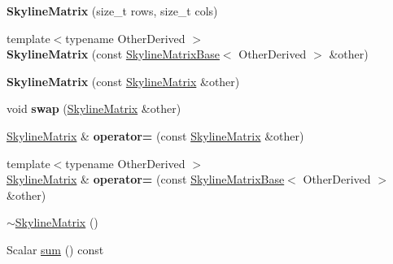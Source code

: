 \begin{DoxyCompactItemize}
{\bfseries Skyline\+Matrix} (size\+\_\+t rows, size\+\_\+t cols)
\item 
\mbox{\label{class_eigen_1_1_skyline_matrix_a8dbe4249614b89be421470e78592ce5b}} 
{\footnotesize template$<$typename Other\+Derived $>$ }\\{\bfseries Skyline\+Matrix} (const \hyperlink{class_eigen_1_1_skyline_matrix_base}{Skyline\+Matrix\+Base}$<$ Other\+Derived $>$ \&other)
\item 
\mbox{\label{class_eigen_1_1_skyline_matrix_af121abd994f8cb8a8b2c71eeaa843237}} 
{\bfseries Skyline\+Matrix} (const \hyperlink{class_eigen_1_1_skyline_matrix}{Skyline\+Matrix} \&other)
\item 
\mbox{\label{class_eigen_1_1_skyline_matrix_ab7c63da758aec8c76c3702c09b5f76a9}} 
void {\bfseries swap} (\hyperlink{class_eigen_1_1_skyline_matrix}{Skyline\+Matrix} \&other)
\item 
\mbox{\label{class_eigen_1_1_skyline_matrix_a00f9f9d0c8006efcc90074d8d6b046a2}} 
\hyperlink{class_eigen_1_1_skyline_matrix}{Skyline\+Matrix} \& {\bfseries operator=} (const \hyperlink{class_eigen_1_1_skyline_matrix}{Skyline\+Matrix} \&other)
\item 
\mbox{\label{class_eigen_1_1_skyline_matrix_a1f0aa06c7086d658416dc57076642525}} 
{\footnotesize template$<$typename Other\+Derived $>$ }\\\hyperlink{class_eigen_1_1_skyline_matrix}{Skyline\+Matrix} \& {\bfseries operator=} (const \hyperlink{class_eigen_1_1_skyline_matrix_base}{Skyline\+Matrix\+Base}$<$ Other\+Derived $>$ \&other)
\item 
\hyperlink{class_eigen_1_1_skyline_matrix_a456b254a757d26580b2c05fe270eaae7}{$\sim$\+Skyline\+Matrix} ()
\item 
Scalar \hyperlink{class_eigen_1_1_skyline_matrix_a56c9841de52e52744a2d5e6593979154}{sum} () const
\end{DoxyCompactItemize}
